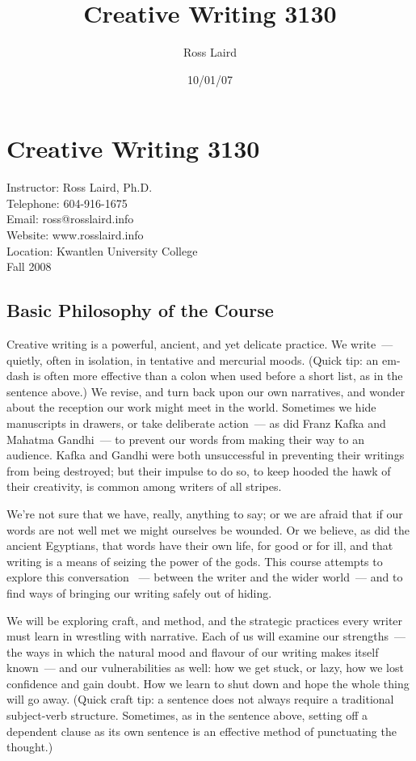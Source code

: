 \documentclass[letterpaper,10pt,headsepline]{scrreprt}
\author{Ross Laird}
\title{Creative Writing 3130}
\date{10/01/07}
\begin{document}
\section{Creative Writing 3130}
Instructor: Ross Laird, Ph.D.\\ 
Telephone: 604-916-1675\\
Email: ross@rosslaird.info\\
Website: www.rosslaird.info\\
Location: Kwantlen University College\\
Fall 2008\\

\subsection{Basic Philosophy of the Course}
Creative writing is a powerful, ancient, and yet delicate practice. We
write~--- quietly, often in isolation, in tentative and mercurial
moods. (Quick tip: an em-dash is often more effective than a colon
when used before a short list, as in the sentence above.) We revise,
and turn back upon our own narratives, and wonder about the reception
our work might meet in the world. Sometimes we hide manuscripts in
drawers, or take deliberate action~--- as did Franz Kafka and Mahatma
Gandhi~--- to prevent our words from making their way to an audience.
Kafka and Gandhi were both unsuccessful in preventing their writings
from being destroyed; but their impulse to do so, to keep hooded the
hawk of their creativity, is common among writers of all stripes.

We're not sure that we have, really, anything to say; or we are afraid
that if our words are not well met we might ourselves be wounded. Or
we believe, as did the ancient Egyptians, that words have their own
life, for good or for ill, and that writing is a means of seizing the
power of the gods. This course attempts to explore this conversation
~--- between the writer and the wider world~--- and to find ways of
bringing our writing safely out of hiding.

We will be exploring craft, and method, and the strategic practices
every writer must learn in wrestling with narrative. Each of us will
examine our strengths~--- the ways in which the natural mood and
flavour of our writing makes itself known~--- and our vulnerabilities
as well: how we get stuck, or lazy, how we lost confidence and gain
doubt. How we learn to shut down and hope the whole thing will go
away. (Quick craft tip: a sentence does not always require a
traditional subject-verb structure. Sometimes, as in the sentence
above, setting off a dependent clause as its own sentence is an
effective method of punctuating the thought.)
\end{document}
